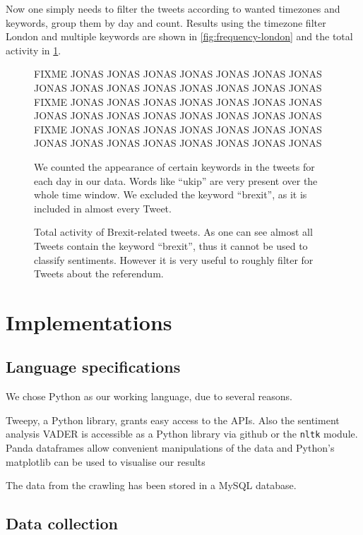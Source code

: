 \documentclass{emulateapj}
\begin{document}
Now one simply needs to filter the tweets according to wanted timezones and keywords, group them by day and count.
Results using the timezone filter London and multiple keywords are shown in \cref{fig:frequency-london} and the total 
activity in \cref{fig:frequency-tot}.

\newpage
\begin{figure}
  \caption{FIXME JONAS JONAS JONAS JONAS JONAS JONAS JONAS JONAS JONAS JONAS JONAS JONAS JONAS JONAS JONAS
           FIXME JONAS JONAS JONAS JONAS JONAS JONAS JONAS JONAS JONAS JONAS JONAS JONAS JONAS JONAS JONAS
           FIXME JONAS JONAS JONAS JONAS JONAS JONAS JONAS JONAS JONAS JONAS JONAS JONAS JONAS JONAS JONAS}
  \caption{We counted the appearance of certain keywords in the tweets for each day in our data.
           Words like ``ukip'' are very present over the whole time window. We excluded the keyword ``brexit'',
           as it is included in almost every Tweet.\label{fig:frequency-london}}
  \caption{Total activity of Brexit-related tweets. As one can see almost all Tweets contain the keyword ``brexit'',
           thus it cannot be used to classify sentiments. However it is very useful to roughly filter for Tweets about
           the referendum.\label{fig:frequency-tot}}
\end{figure}
\newpage

\section{Implementations}\label{sec:Implementations}

\subsection{Language specifications}
We chose Python as our working language, due to several reasons.

Tweepy\cite{tweepy}, a Python library, grants easy access to the APIs. Also the sentiment analysis VADER is accessible as a Python library via github or the \texttt{nltk} module.
Panda dataframes allow convenient manipulations of the data and Python's matplotlib can be used to visualise our results

The data from the crawling has been stored in a MySQL database.

\subsection{Data collection}
\end{document}

